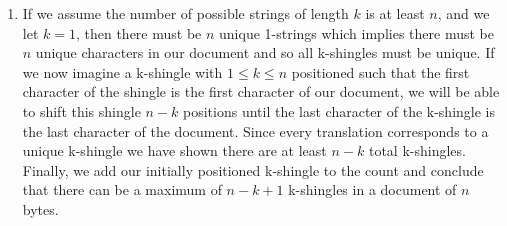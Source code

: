 \documentclass{article}
\begin{document}
\begin{enumerate}[label=\alph*., left=10pt, itemsep=10pt]
\begin{minipage}[t]{0.9\textwidth}
        \end{minipage}

        \item \begin{minipage}[t]{0.9\textwidth}
            If we assume the number of possible strings of length $k$ is at least $n$, and we let $k=1$, then there must be $n$ unique 1-strings
            which implies there must be $n$ unique characters in our document and so all k-shingles must be unique.
            If we now imagine a k-shingle with $1 \leq k \leq n$ positioned such that the first character of the shingle is the first character of
            our document, we will be able to shift this shingle $n-k$ positions until the last character of the k-shingle is the last character of
            the document. Since every translation corresponds to a unique k-shingle we have shown there are at least $n-k$ total k-shingles. Finally,
            we add our initially positioned k-shingle to the count and conclude that there can be a maximum of $n-k+1$ k-shingles in a document of
            $n$ bytes.
        \end{minipage}

    \end{enumerate}
\end{document}
